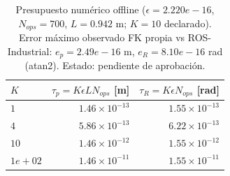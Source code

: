 \begin{table}[htbp]
\centering
\scriptsize
\setlength{\tabcolsep}{3pt}
\renewcommand{\arraystretch}{1.15}
\caption{Presupuesto numérico offline ($\epsilon=2.220e-16$, $N_{ops}=700$, $L=0.942$ m; $K=10$ declarado). Error máximo observado FK propia vs ROS-Industrial: $e_p=2.49e-16$ m, $e_R=8.10e-16$ rad (atan2). Estado: pendiente de aprobación.}
\label{tab:G}
\begin{tabular}{lrr}
\toprule
\textbf{$K$} & \textbf{$\tau_p=K\epsilon L N_{ops}$ [m]} & \textbf{$\tau_R=K\epsilon N_{ops}$ [rad]} \\
\midrule
$1$ & $1.46\times10^{-13}$ & $1.55\times10^{-13}$ \\
$4$ & $5.86\times10^{-13}$ & $6.22\times10^{-13}$ \\
$10$ & $1.46\times10^{-12}$ & $1.55\times10^{-12}$ \\
$1e+02$ & $1.46\times10^{-11}$ & $1.55\times10^{-11}$ \\
\bottomrule
\end{tabular}
\end{table}
